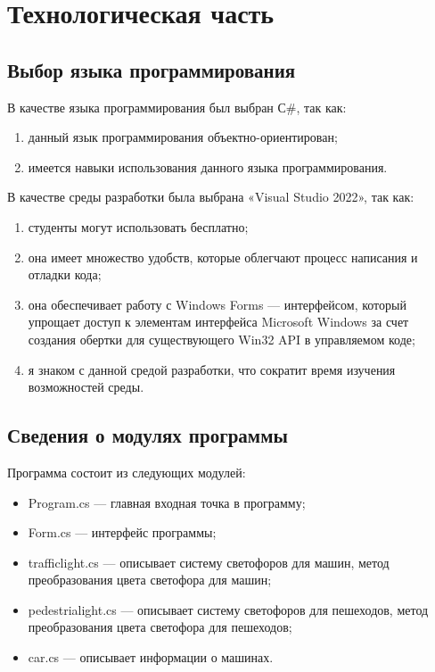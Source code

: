 
\section{Технологическая часть}
\subsection{Выбор языка программирования}
В качестве языка программирования был выбран С\#, так как:
\begin{enumerate}
    \item данный язык программирования объектно-ориентирован;
    \item имеется навыки использования данного языка программирования.
\end{enumerate}

\hfill

В качестве среды разработки была выбрана «Visual Studio 2022», так как:
\begin{enumerate}
    \item студенты могут использовать бесплатно;
    \item она имеет множество удобств, которые облегчают процесс написания и отладки кода;
    \item она обеспечивает работу с Windows Forms --- интерфейсом, который упрощает доступ к элементам интерфейса Microsoft Windows за счет создания обертки для существующего Win32 API в управляемом коде;
    \item я знаком с данной средой разработки, что сократит время изучения возможностей среды.
\end{enumerate}
\subsection{Сведения о модулях программы}
Программа состоит из следующих модулей:
\begin{itemize}[label = ---]
    \item Program.cs --- главная входная точка в программу; 
    \item Form.cs --- интерфейс программы;
    \item trafficlight.cs --- описывает систему светофоров для машин, метод преобразования цвета светофора для машин;
    \item pedestrialight.cs --- описывает систему светофоров для пешеходов, метод преобразования цвета светофора для пешеходов;
    \item car.cs --- описывает информации о машинах.
\end{itemize}

